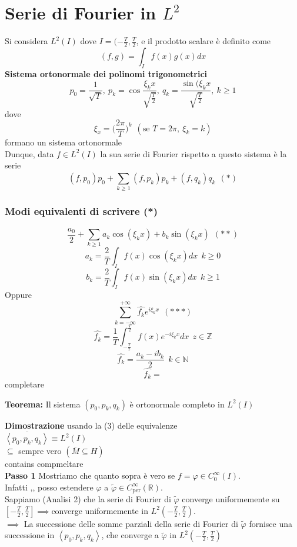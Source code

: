 \documentclass[a4paper]{article}
\newcommand{\R}{\mathbb{R}}
\newcommand{\N}{\mathbb{N}}
\newcommand{\Z}{\mathbb{Z}}
\begin{document}
\section{Serie di Fourier in $L^2$}
Si considera $L^{2}(I)$ dove $I=(-\frac{T}{2},\frac{T}{2}$, e il prodotto scalare è definito come
\[(f,g)=\int_{I}^{} f(x)g(x)dx\]
\textbf{Sistema ortonormale dei polinomi trigonometrici}
\[p_0=\frac{1}{\sqrt{T} },\ p_k=\cos\frac{\xi_kx}{\sqrt{\frac{T}{2}} },\ q_k= \frac{\sin(\xi_kx}{\sqrt{\frac{T}{2}} },\ k\ge 1\]
dove 
\[\xi_x=\bigg(\frac{2\pi}{T}\bigg)^k\ \ (\text{se }T=2\pi,\ \xi_k=k)\]
formano un sistema ortonormale
\\Dunque, data $f\in L^{2}(I)$ la sua serie di Fourier rispetto a questo sistema è la serie
\[(f,p_0)p_0+\sum_{k\ge 1}^{} (f,p_k)p_k+(f,q_k)q_k\ \ (*)\]
\subsubsection{Modi equivalenti di scrivere (*)}
\[\frac{a_0}{2}+\sum_{k\ge 1}^{} a_k\cos(\xi_kx)+b_k\sin(\xi_kx)\ \ (* *)\]
\[a_k=\frac{2}{T}\int_{I}^{} f(x)\cos(\xi_kx)dx\ \ k\ge 0\]
\[b_k=\frac{2}{T}\int_{I}^{} f(x)\sin(\xi_kx)dx\ \ k\ge 1\]
Oppure 
\[\sum_{k=-\infty}^{+\infty} \hat{f_k}e^{i\xi_kx}\ \ (* * *)\]
\[\hat{f_k}=\frac{1}{T}\int_{-\frac{T}{2}}^{\frac{T}{2}} f(x)e^{-i\xi_kx}dx\ \ z\in \Z\]
\[\hat{f_k}= \frac{a_k-ib_k}{2}\ \ k\in \N\]
\[\hat{f_k}= \]
completare
\begin{tcolorbox}
	\textbf{Teorema: }Il sistema $(p_0,p_k,q_k)$ è ortonormale completo in $L^{2}(I)$
\end{tcolorbox}
\textbf{Dimostrazione} usando la (3) delle equivalenze
\\$\overline{\left< p_0,p_k,q_k \right> }\equiv L^{2}(I)$ 
\\$\subseteq  $ sempre vero $(\overline{M}\subseteq  H)$ 
\\contains compmeltare
\\\textbf{Passo 1} Mostriamo che quanto sopra è vero se $f=\varphi\in C_0^\infty(I)$.
\\Infatti ,, posso estendere $\varphi$ a $\tilde\varphi\in C_{\text{per}}^\infty(\R)$.
\\Sappiamo (Analisi 2) che la serie di Fourier di $\tilde\varphi$ converge uniformemente su $[-\frac{T}{2},\frac{T}{2}]\implies $converge uniformemente in $L^{2}(-\frac{T}{2},\frac{T}{2})$.
\\$\implies $ La successione delle somme parziali della serie di Fourier di $\tilde\varphi$ fornisce una successione in $\left< p_0,p_k,q_k \right> $, che converge a $\tilde\varphi$ in $L^{2}(-\frac{T}{2},\frac{T}{2})$
\end{document}
